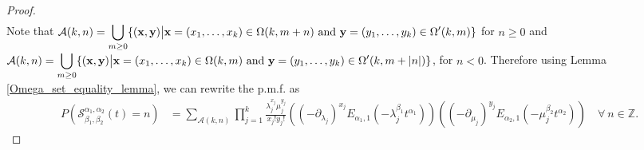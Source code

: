 \documentclass[11pt,oneside,reqno]{amsart}
\theoremstyle{definition}
\theoremstyle{remarkstyle}
\begin{document}
\begin{proof}
\begin{align*}
\end{align*}
Note that $\displaystyle\mathcal{A}(k,n)=\bigcup_{m\ge0}\{({\bf x},{\bf y})\big|{\bf x}=(x_1,\dots,x_k)\in\Omega(k,m+n)~\text{and}~{\bf y}=(y_1,\dots,y_k)\in\Omega'(k,m)\}$  for $n\ge 0$ and $\displaystyle\mathcal{A}(k,n)=\bigcup_{m\ge0}\{({\bf x},{\bf y})\big|{\bf x}=(x_1,\dots,x_k)\in\Omega(k,m)~\text{and}~{\bf y}= (y_1,\dots,y_k)\in\Omega'(k,m+|n|)\}$, for $n< 0$. Therefore using Lemma \ref{Omega_set_equality_lemma}, we can rewrite the p.m.f. as
\begin{align*}
P(\mathcal{S}_{\beta_1,\beta_2}^{\alpha_1,\alpha_2}(t)=n)&=\sum_{\mathcal{A}(k,n)}\prod_{j=1}^{k}\frac{\lambda_j^{x_j}\mu_j^{y_j}}{x_j!y_j!}((-\partial_{\lambda_j})^{x_j}E_{\alpha_1,1}(-\lambda_j^{\beta_1} t^{\alpha_1}))((-\partial_{\mu_j})^{y_j}E_{\alpha_2,1}(-\mu_j^{\beta_2} t^{\alpha_2}))\quad\forall~n\in\mathbb{Z}.
\end{align*}


\end{proof}
\end{document}
